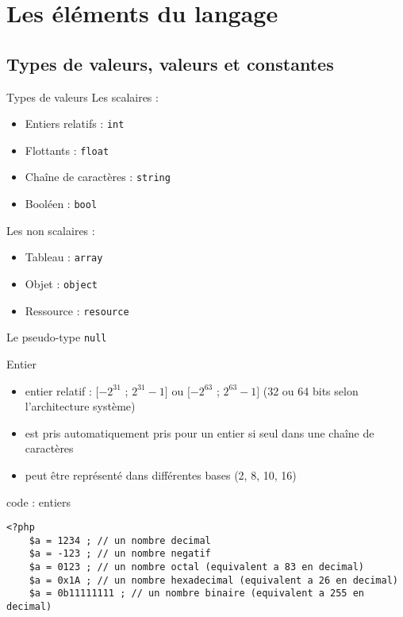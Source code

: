 
\section{Les éléments du langage}


\subsection{Types de valeurs, valeurs et constantes}

\begin{frame}{Types de valeurs}
Les scalaires :
\begin{itemize}
\item Entiers relatifs : \texttt{int}
\item Flottants : \texttt{float}
\item Chaîne de caractères : \texttt{string}
\item Booléen : \texttt{bool}
\end{itemize}
Les non scalaires :
\begin{itemize}
\item Tableau : \texttt{array}
\item Objet : \texttt{object}
\item Ressource : \texttt{resource}
\end{itemize}
Le pseudo-type \texttt{null}
\end{frame}

\begin{frame}[containsverbatim]{Entier}
\begin{itemize}
\item entier relatif : $[-2^{31}$ ; $2^{31} - 1]$ ou  $[-2^{63}$ ; $2^{63} - 1]$ (32 ou 64 bits selon l'architecture système)
\item est pris automatiquement pris pour un entier si seul dans une chaîne de caractères
\item peut être représenté dans différentes bases (2, 8, 10, 16) 
\end{itemize}
\begin{block}{code : entiers}
\begin{lstlisting}
<?php
	$a = 1234 ; // un nombre decimal
	$a = -123 ; // un nombre negatif
	$a = 0123 ; // un nombre octal (equivalent a 83 en decimal)
	$a = 0x1A ; // un nombre hexadecimal (equivalent a 26 en decimal)
	$a = 0b11111111 ; // un nombre binaire (equivalent a 255 en decimal)
\end{lstlisting}
\end{block}
\end{frame}


